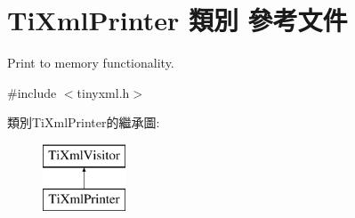 \hypertarget{class_ti_xml_printer}{}\section{Ti\+Xml\+Printer 類別 參考文件}
\label{class_ti_xml_printer}


Print to memory functionality.  




{\ttfamily \#include $<$tinyxml.\+h$>$}

類別\+Ti\+Xml\+Printer的繼承圖\+:\begin{figure}[H]
\begin{center}
\leavevmode
\includegraphics[height=2.000000cm]{class_ti_xml_printer}
\end{center}
\end{figure}
